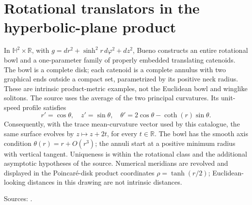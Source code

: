 \chapter{Rotational translators in the hyperbolic-plane product}\label{sec:catalogue-hyperbolic-product-rotational-translators}
\begin{example}\label{ex:catalogue-hyperbolic-product-rotational-translators}
In $\mathbb H^2\times\mathbb R$, with $g=dr^2+\sinh^2r\,d\varphi^2+dz^2$, Bueno constructs an entire rotational bowl and a one-parameter family of properly embedded translating catenoids. The bowl is a complete disk; each catenoid is a complete annulus with two graphical ends outside a compact set, parametrized by its positive neck radius. These are intrinsic product-metric examples, not the Euclidean bowl and winglike solitons.
The source uses the average of the two principal curvatures. Its unit-speed profile satisfies
\[
 r'=\cos\theta,\quad z'=\sin\theta,\quad
 \theta'=2\cos\theta-\coth(r)\sin\theta.
\]
Consequently, with the trace mean-curvature vector used by this catalogue, the same surface evolves by $z\mapsto z+2t$, for every $t\in\mathbb R$. The bowl has the smooth axis condition $\theta(r)=r+O(r^3)$; the annuli start at a positive minimum radius with vertical tangent. Uniqueness is within the rotational class and the additional asymptotic hypotheses of the source. Numerical meridians are revolved and displayed in the Poincar\'e-disk product coordinates $\rho=\tanh(r/2)$; Euclidean-looking distances in this drawing are not intrinsic distances.
\par Sources: \cite{CatBueno2018}.
\end{example}

